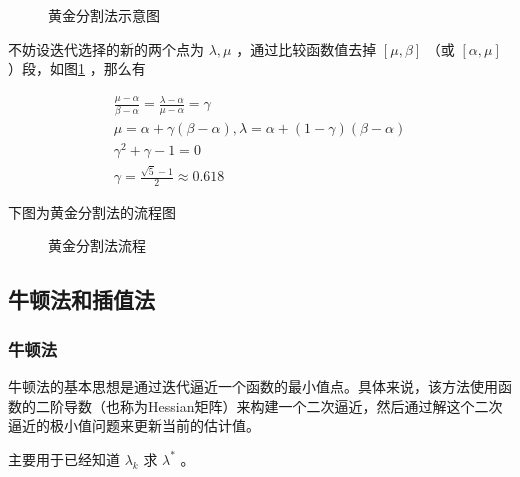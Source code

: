 \documentclass{book}
\begin{document}
\begin{figure}[ht]
    \centering
    \caption{黄金分割法示意图}
    \label{fig:Golden section method}
\end{figure}

不妨设迭代选择的新的两个点为 $\lambda,\mu$ ，通过比较函数值去掉 $[\mu,\beta]$ （或 $[\alpha,\mu]$ ）段，如图\ref{fig:Golden section method} ，那么有

\begin{gather*}
    \frac{\mu-\alpha}{\beta-\alpha}=\frac{\lambda-\alpha}{\mu-\alpha}=\gamma       \\
    \mu=\alpha+\gamma(\beta-\alpha),\lambda=\alpha+(1-\gamma)(\beta-\alpha) \\
    \gamma^2+\gamma-1 =0                                       \\
    \gamma=\frac{\sqrt{5}-1}{2}\approx0.618
\end{gather*}

下图为黄金分割法的流程图

\begin{figure}[ht]
    \centering
    
    \caption{黄金分割法流程}
    \label{fig:flow of Golden section method}
\end{figure}

\subsection{牛顿法和插值法}

\subsubsection{牛顿法}

牛顿法的基本思想是通过迭代逼近一个函数的最小值点。具体来说，该方法使用函数的二阶导数（也称为Hessian矩阵）来构建一个二次逼近，然后通过解这个二次逼近的极小值问题来更新当前的估计值。

主要用于已经知道 $\lambda_k$ 求 $\lambda^*$ 。
\end{document}
